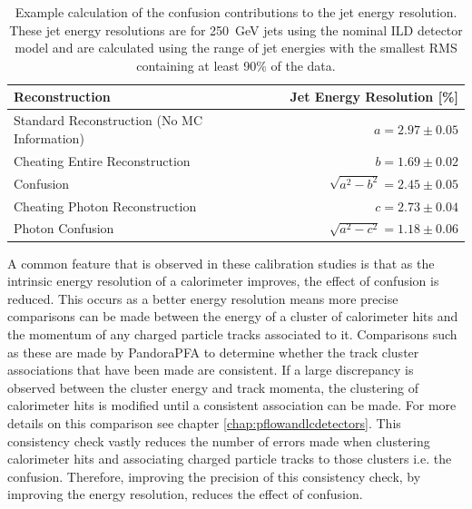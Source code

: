\begin{table}[h!]
\centering
\begin{tabular}{ l r}
\hline
Reconstruction & Jet Energy Resolution [\%] \\
\hline
Standard Reconstruction (No MC Information) & $a = 2.97\pm0.05$ \\
Cheating Entire Reconstruction & $b = 1.69\pm0.02$ \\
Confusion & $\sqrt{a^{2}-b^{2}} = 2.45\pm0.05$ \\
\hline
Cheating Photon Reconstruction & $c = 2.73\pm0.04$ \\
Photon Confusion & $\sqrt{a^{2}-c^{2}} =1.18\pm0.06$ \\
\hline
\end{tabular}
\caption[Example calculation of the confusion contributions to the jet energy resolution.  These jet energy resolutions are for 250~GeV jets using the nominal ILD detector model and are calculated using the range of jet energies with the smallest RMS containing at least 90\% of the data.]{Example calculation of the confusion contributions to the jet energy resolution.  These jet energy resolutions are for 250~GeV jets using the nominal ILD detector model and are calculated using the range of jet energies with the smallest RMS containing at least 90\% of the data.}
\label{table:confusioncalculation}
\end{table}

A common feature that is observed in these calibration studies is that as the intrinsic energy resolution of a calorimeter improves, the effect of confusion is reduced.  This occurs as a better energy resolution means more precise comparisons can be made between the energy of a cluster of calorimeter hits and the momentum of any charged particle tracks associated to it.  Comparisons such as these are made by PandoraPFA to determine whether the track cluster associations that have been made are consistent.  If a large discrepancy is observed between the cluster energy and track momenta, the clustering of calorimeter hits is modified until a consistent association can be made.  For more details on this comparison see chapter \ref{chap:pflowandlcdetectors}.  This consistency check vastly reduces the number of errors made when clustering calorimeter hits and associating charged particle tracks to those clusters i.e. the confusion.  Therefore, improving the precision of this consistency check, by improving the energy resolution, reduces the effect of confusion.  


